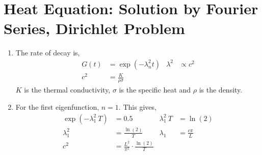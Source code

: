 \section{Heat Equation: Solution by Fourier Series, Dirichlet Problem}

\begin{enumerate}
    \item The rate of decay is,
          \begin{align}
              G(t)      & =  \exp(-\lambda_n^2 t) &
              \lambda^2 & \propto c^2               \\
              c^2       & = \frac{K}{\rho \sigma}
          \end{align}
          $ K $ is the thermal conductivity, $ \sigma $ is the specific heat and $ \rho $
          is the density.

    \item For the first eigenfunction, $ n = 1 $. This gives,
          \begin{align}
              \exp(-\lambda_1^2\ T) & = 0.5                                      &
              \lambda_1^2\ T        & = \ln(2)                                     \\
              \lambda_1^2           & = \frac{\ln(2)}{T}                         &
              \lambda_1             & = \frac{c\pi}{L}                             \\
              c^2                   & = \frac{L^2}{\pi^2} \cdot \frac{\ln(2)}{T}
          \end{align}


\end{enumerate}
